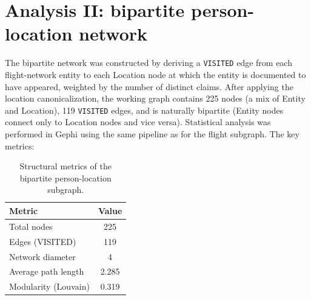 \section{Analysis II: bipartite person-location network}
The bipartite network was constructed by deriving a \texttt{VISITED} edge from each flight-network entity to each Location node at which the entity is documented to have appeared, weighted by the number of distinct claims. After applying the location canonicalization, the working graph contains 225 nodes (a mix of Entity and Location), 119 \texttt{VISITED} edges, and is naturally bipartite (Entity nodes connect only to Location nodes and vice versa).
Statistical analysis was performed in Gephi using the same pipeline as for the flight subgraph. The key metrics:
\begin{table}[H]
    \centering
    \begin{tabular}{l c}
        \toprule
        Metric & Value \\
        \midrule
            Total nodes & 225 \\
            Edges (VISITED) & 119 \\
            Network diameter & 4 \\
            Average path length & 2.285 \\
            Modularity (Louvain) & 0.319 \\
        \bottomrule
    \end{tabular}
    \caption{Structural metrics of the bipartite person-location subgraph.}
    \label{tab:bipartite_metrics}
\end{table}
